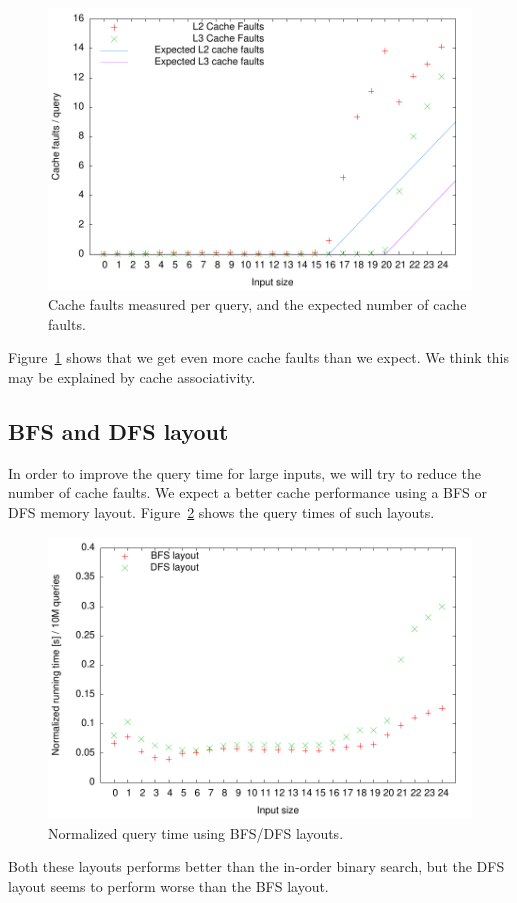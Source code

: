 \begin{figure}[h!]
  \label{fig:bs_cachefaults}
  \centering
  \includegraphics{../week1/plots/outputs/bs_cachefaults}
  \caption{Cache faults measured per query, and the expected number of cache faults.}
\end{figure}

Figure~\ref{fig:bs_cachefaults} shows that we get even more cache
faults than we expect. We think this may be explained by cache
associativity.

\subsection{BFS and DFS layout}
In order to improve the query time for large inputs, we will try to
reduce the number of cache faults. We expect a better cache
performance using a BFS or DFS memory
layout. Figure~\ref{fig:bfs_dfs_runningtime} shows the query times of
such layouts.

\begin{figure}[h!]
  \label{fig:bfs_dfs_runningtime}
  \centering
  \includegraphics{../week1/plots/outputs/bfs_dfs_runningtime}
  \caption{Normalized query time using BFS/DFS layouts.}
\end{figure}

Both these layouts performs better than the in-order binary search,
but the DFS layout seems to perform worse than the BFS layout.
